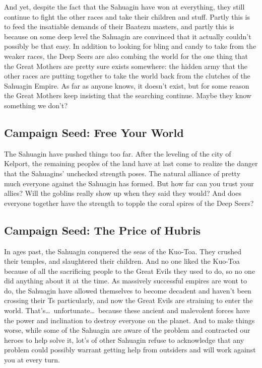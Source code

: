 And yet, despite the fact that the Sahuagin have won at everything, they still continue to fight the other races and take their children and stuff. Partly this is to feed the insatiable demands of their Baatezu masters, and partly this is because on some deep level the Sahuagin are convinced that it actually couldn't possibly be that easy. In addition to looking for bling and candy to take from the weaker races, the Deep Seers are also combing the world for the one thing that the Great Mothers are pretty sure exists somewhere: the hidden army that the other races are putting together to take the world back from the clutches of the Sahuagin Empire. As far as anyone knows, it doesn't exist, but for some reason the Great Mothers keep insisting that the searching continue. Maybe they know something we don't?

\subsection{Campaign Seed: Free Your World}
The Sahuagin have pushed things too far. After the leveling of the city of Kelport, the remaining peoples of the land have at last come to realize the danger that the Sahuagins' unchecked strength poses. The natural alliance of pretty much everyone against the Sahuagin has formed. But how far can you trust your allies? Will the goblins really show up when they said they would? And does everyone together have the strength to topple the coral spires of the Deep Seers?

\subsection{Campaign Seed: The Price of Hubris}
In ages past, the Sahuagin conquered the seas of the Kuo-Toa. They crushed their temples, and slaughtered their children. And no one liked the Kuo-Toa because of all the sacrificing people to the Great Evils they used to do, so no one did anything about it at the time. As massively successful empires are wont to do, the Sahuagin have allowed themselves to become decadent and haven't been crossing their Ts particularly, and now the Great Evils are straining to enter the world. That's\ldots\  unfortunate\ldots\  because these ancient and malevolent forces have the power and inclination to destroy everyone on the planet. And to make things worse, while some of the Sahuagin are aware of the problem and contracted our heroes to help solve it, lot's of other Sahuagin refuse to acknowledge that any problem could possibly warrant getting help from outsiders and will work against you at every turn.

